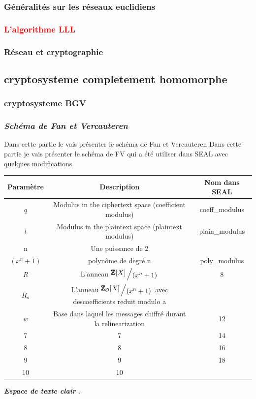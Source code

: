 \documentclass[a4paper,11pt]{report}
\begin{document}
\subsubsection*{Généralités sur les réseaux euclidiens}
\subsubsection*{\textcolor{red}{L'algorithme LLL}}
\subsubsection*{Réseau et cryptographie}
\subsection*{cryptosysteme completement homomorphe}
\subsubsection*{cryptosysteme BGV}
\subsubsection*{\textit{Schéma de  Fan et Vercauteren}}
Dans cette partie le vais présenter le schéma de Fan et Vercauteren\newline
Dans cette partie je vais présenter le schéma de FV qui a été utiliser dans SEAL avec quelques modifications.\newline
\newline
\vspace{100\baselineskip}
\newcommand{\bigslant}[2]{{\raisebox{.2em}{$#1$}\left/\raisebox{-.2em}{$#2$}\right.}}
\begin{tabular}{|c|c|c|}

\hline
 Paramètre& Description & Nom dans SEAL \\
\hline
$q$ & Modulus in the ciphertext space (coefficient modulus) & coeff\_modulus  \\
\hline
$t$ & Modulus in the plaintext space (plaintext modulus) & plain\_modulus \\
\hline
n & Une puissance de 2 &   \\
\hline
$(x^{n}+1)$ & polynôme de degré n  & poly\_modulus  \\
\hline
$R$ & L'anneau $\bigslant{\pmb{\mathbb{Z}}[X]}{(x^{n}+1)}$ & 8  \\
\hline
$R_a$ & L'anneau $\bigslant{\pmb{\mathbb{Z_a}}[X]}{(x^{n}+1)}$ avec descoefficients reduit modulo a &  \\
\hline
$w$ & Base dans laquel les messages chiffré durant la relinearization & 12 \\
\hline
7 & 7 & 14 \\
\hline
8 & 8 & 16 \\
\hline
9 & 9 & 18 \\
\hline
10 & 10 & \\
\hline

\end{tabular}
\newline
\textbf{\textit{ Espace de texte clair .}}\newline
\end{document}
